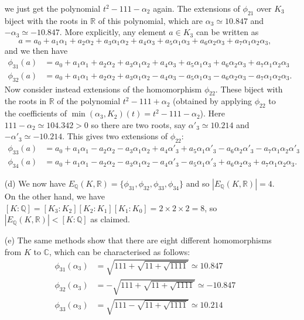 \documentclass{amsart}
\newcommand{\Q}         {{\mathbb{Q}}}
\newcommand{\R}         {{\mathbb{R}}}
\newcommand{\C}         {{\mathbb{C}}}
\newcommand{\al}        {\alpha}
\newcommand{\tm}        {\times}
\renewcommand{\:}{\colon}
\newenvironment{solution}{\SolutionInline}{\endSolutionInline}
\theoremstyle{definition}
\renewenvironment{solution}{\SolutionAtEnd}{\endSolutionAtEnd}
\begin{document}
\begin{solution}
\begin{itemize}
   we just get the polynomial $t^2-111-\al_2$ again.  The extensions of
   $\phi_{21}$ over $K_3$ biject with the roots in $\R$ of this
   polynomial, which are $\al_3\simeq 10.847$ and $-\al_3\simeq
   -10.847$.  More explicitly, any element $a\in K_3$ can be written as 
   \[ a = a_0 + a_1\al_1 + a_2\al_2 + a_3\al_1\al_2 + 
          a_4\al_3 + a_5\al_1\al_3 + a_6\al_2\al_3 + a_7\al_1\al_2\al_3,
   \]
   and we then have 
   \begin{align*}
    \phi_{31}(a) &= 
          a_0 + a_1\al_1 + a_2\al_2 + a_3\al_1\al_2 + 
          a_4\al_3 + a_5\al_1\al_3 + a_6\al_2\al_3 + a_7\al_1\al_2\al_3\\
    \phi_{32}(a) &=
          a_0 + a_1\al_1 + a_2\al_2 + a_3\al_1\al_2 -
          a_4\al_3 - a_5\al_1\al_3 - a_6\al_2\al_3 - a_7\al_1\al_2\al_3.
   \end{align*}
   Now consider instead extensions of the homomorphism $\phi_{22}$.
   These biject with the roots in $\R$ of the polynomial $t^2-111+\al_2$
   (obtained by applying $\phi_{22}$ to the coefficients of
   $\min(\al_3,K_2)(t)=t^2-111-\al_2$).  Here $111-\al_2\simeq
   104.342>0$ so there are two roots, say $\al'_3\simeq 10.214$ and
   $-\al'_3\simeq -10.214$.  This gives two extensions of $\phi_{22}$:
   \begin{align*}
    \phi_{33}(a) &= 
          a_0 + a_1\al_1 - a_2\al_2 - a_3\al_1\al_2 + 
          a_4\al'_3 + a_5\al_1\al'_3 - a_6\al_2\al'_3 - a_7\al_1\al_2\al'_3\\
    \phi_{34}(a) &=
          a_0 + a_1\al_1 - a_2\al_2 - a_3\al_1\al_2 -
          a_4\al'_3 - a_5\al_1\al'_3 + a_6\al_2\al_3 + a_7\al_1\al_2\al_3.
   \end{align*}
  \item[(d)] We now have
   $E_\Q(K,\R)=\{\phi_{31},\phi_{32},\phi_{33},\phi_{34}\}$ and so
   $|E_\Q(K,\R)|=4$.  On the other hand, we have
   $[K:\Q]=[K_3:K_2][K_2:K_1][K_1:K_0]=2\tm 2\tm 2=8$, so
   $|E_\Q(K,\R)|<[K:\Q]$ as claimed.
  \item[(e)] The same methods show that there are eight different
   homomorphisms from $K$ to $\C$, which can be characterised as
   follows:
   \begin{align*}
    \phi_{31}(\al_3) &= \sqrt{111+\sqrt{11+\sqrt{1111}}} \simeq 10.847 \\
    \phi_{32}(\al_3) &= -\sqrt{111+\sqrt{11+\sqrt{1111}}} \simeq -10.847 \\
    \phi_{33}(\al_3) &= \sqrt{111-\sqrt{11+\sqrt{1111}}} \simeq 10.214 \\

\end{align*}
\end{itemize}
\end{solution}
\end{document}

